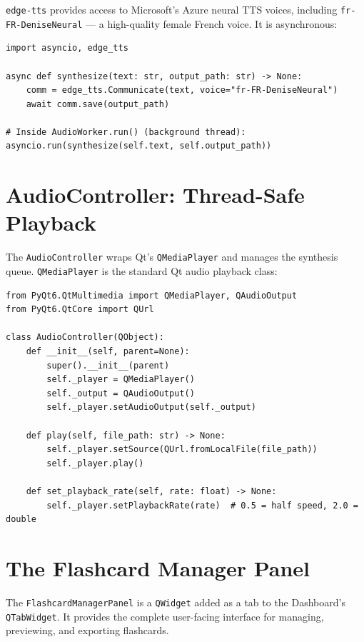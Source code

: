 \documentclass[12pt,oneside]{book}
\begin{document}
\texttt{edge-tts} provides access to Microsoft's Azure neural TTS voices, including
\texttt{fr-FR-DeniseNeural} — a high-quality female French voice. It is asynchronous:

\begin{lstlisting}[caption={edge-tts usage (async, LLR-35)}]
import asyncio, edge_tts

async def synthesize(text: str, output_path: str) -> None:
    comm = edge_tts.Communicate(text, voice="fr-FR-DeniseNeural")
    await comm.save(output_path)

# Inside AudioWorker.run() (background thread):
asyncio.run(synthesize(self.text, self.output_path))
\end{lstlisting}

\section{AudioController: Thread-Safe Playback}

The \texttt{AudioController} wraps Qt's \texttt{QMediaPlayer} and manages the synthesis
queue. \texttt{QMediaPlayer} is the standard Qt audio playback class:

\begin{lstlisting}[caption={AudioController playback controls (LLR-31)}]
from PyQt6.QtMultimedia import QMediaPlayer, QAudioOutput
from PyQt6.QtCore import QUrl

class AudioController(QObject):
    def __init__(self, parent=None):
        super().__init__(parent)
        self._player = QMediaPlayer()
        self._output = QAudioOutput()
        self._player.setAudioOutput(self._output)

    def play(self, file_path: str) -> None:
        self._player.setSource(QUrl.fromLocalFile(file_path))
        self._player.play()

    def set_playback_rate(self, rate: float) -> None:
        self._player.setPlaybackRate(rate)  # 0.5 = half speed, 2.0 = double
\end{lstlisting}

\section{The Flashcard Manager Panel}

The \texttt{FlashcardManagerPanel} is a \texttt{QWidget} added as a tab to the
Dashboard's \texttt{QTabWidget}. It provides the complete user-facing interface for
managing, previewing, and exporting flashcards.
\end{document}

